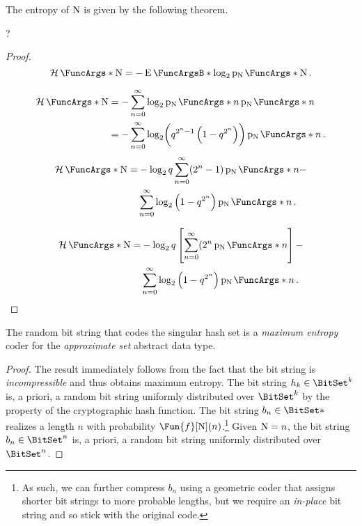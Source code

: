 \documentclass[ ../main.tex]{subfiles}
\begin{document}
The entropy of $\mathrm{N}$ is given by the following theorem.
\begin{theorem}
?
\end{theorem}
\begin{proof}
\begin{equation}
    \Entropy{\RV{N}} = -\Expect{\log_2 \PDF{\RV{N}}[\RV{N}]}\,.
\end{equation}

\begin{align}
    \Entropy{\RV{N}}
        &= -\sum_{n=0}^{\infty} \log_2 \PDF{n}[\RV{N}] \PDF{n}[\RV{N}]\\
        &= -\sum_{n=0}^{\infty} \log_2\! \left(q^{2^n-1}\left(1-q^{2^n}\right)\right) \PDF{n}[\RV{N}]\,.
\end{align}
\begin{equation}
\begin{split}
    \Entropy{\RV{N}}
        =&-\log_2 q \sum_{n=0}^{\infty}
            (2^n-1) \PDF{n}[\RV{N}] -\\
         &\sum_{n=0}^{\infty} \log_2\left(1-q^{2^n}\right) \PDF{n}[\RV{N}]\,.
\end{split}
\end{equation}

\begin{equation}
\begin{split}
    \Entropy{\RV{N}}
        =&-\log_2 q \left[\sum_{n=0}^{\infty}
            (2^n \PDF{n}[\RV{N}]\right] -\\
         &\sum_{n=0}^{\infty} \log_2\left(1-q^{2^n}\right) \PDF{n}[\RV{N}]\,.
\end{split}
\end{equation}
\end{proof}


\begin{theorem}
The random bit string that codes the singular hash set is a \emph{maximum entropy} coder for the \emph{approximate set} abstract data type.
\end{theorem}
\begin{proof}
The result immediately follows from the fact that the bit string is \emph{incompressible} and thus obtains maximum entropy.
The bit string $h_k \in \BitSet^k$ is, a priori, a random bit string uniformly distributed over $\BitSet^k$ by the property of the cryptographic hash function.
The bit string $b_n \in \BitSet*$ realizes a length $n$ with probability $\Fun{f}[\RV{N}](n)$.\footnote{As such, we can further compress $b_n$ using a geometric coder that assigns shorter bit strings to more probable lengths, but we require an \emph{in-place} bit string and so stick with the original code.}
Given $\mathrm{N}=n$, the bit string $b_n \in \BitSet^n$ is, a priori, a random bit string uniformly distributed over $\BitSet^n$.
\end{proof}
\end{document}
